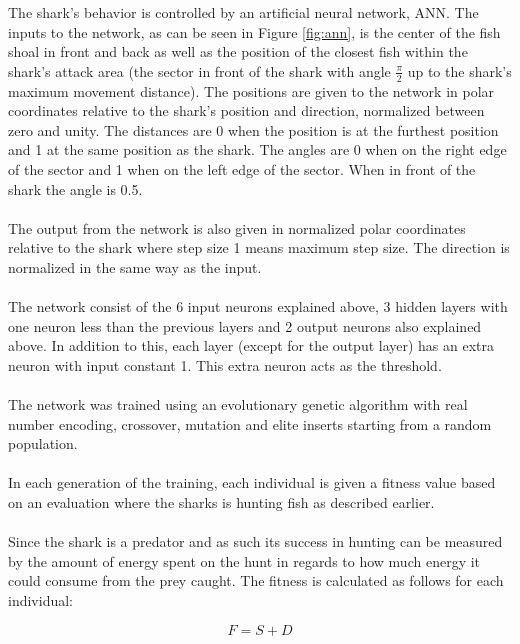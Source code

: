 The shark's behavior is controlled by an artificial neural network, ANN. The
inputs to the network, as can be seen in Figure \ref{fig:ann}, is the center of
the fish shoal in front and back as well as the position of the closest fish
within the shark's attack area (the sector in front of the shark with angle
$\frac{\pi}{2}$ up to the shark's maximum movement distance). The positions are
given to the network in polar coordinates relative to the shark's position and
direction, normalized between zero and unity. The distances are 0 when the
position is at the furthest position and 1 at the same position as the shark.
The angles are 0 when on the right edge of the sector and 1 when on the left
edge of the sector. When in front of the shark the angle is 0.5.\\
\\
The output from the network is also given in normalized polar coordinates
relative to the shark where step size 1 means maximum step size. The direction
is normalized in the same way as the input.\\
\\
The network consist of the 6 input neurons explained above, 3 hidden layers with
one neuron less than the previous layers and 2 output neurons also explained
above. In addition to this, each layer (except for the output layer) has an
extra neuron with input constant 1. This extra neuron acts as the threshold.\\
\\
The network was trained using an evolutionary genetic algorithm with real
number encoding, crossover, mutation and elite inserts starting from a random
population.\\
\\
In each generation of the training, each individual is given a fitness value
based on an evaluation where the sharks is hunting fish as described earlier.\\
\\
Since the shark is a predator and as such its success in hunting can be measured
by the amount of energy spent on the hunt in regards to how much energy it could
consume from the prey caught. The fitness is calculated as follows for each
individual:

\begin{equation}
  F = S+D\label{eq:fitness}
\end{equation}

